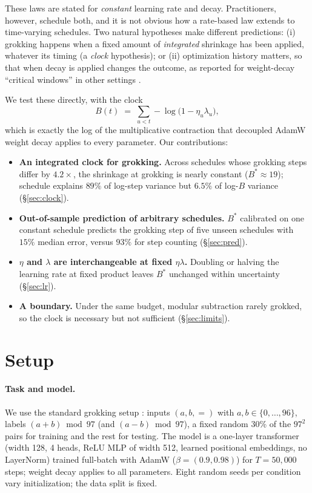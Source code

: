 \documentclass[11pt]{article}
\begin{document}
These laws are stated for \emph{constant} learning rate and decay. Practitioners, however, schedule both, and it is not obvious how a rate-based law extends to time-varying schedules. Two natural hypotheses make different predictions: (i) grokking happens when a fixed amount of \emph{integrated} shrinkage has been applied, whatever its timing (a \emph{clock} hypothesis); or (ii) optimization history matters, so that when decay is applied changes the outcome, as reported for weight-decay ``critical windows'' in other settings \citep{golatkar2019time,ali2026critical}.

We test these directly, with the clock
\begin{equation}
B(t) \;=\; \sum_{u<t} -\log\bigl(1-\eta_u\lambda_u\bigr),
\label{eq:clock}
\end{equation}
which is exactly the log of the multiplicative contraction that decoupled AdamW weight decay \citep{loshchilov2019decoupled} applies to every parameter. Our contributions:
\begin{itemize}
\item \textbf{An integrated clock for grokking.} Across schedules whose grokking steps differ by $4.2\times$, the shrinkage at grokking is nearly constant ($B^\ast\approx 19$); schedule explains $89\%$ of log-step variance but $6.5\%$ of log-$B$ variance (\S\ref{sec:clock}).
\item \textbf{Out-of-sample prediction of arbitrary schedules.} $B^\ast$ calibrated on one constant schedule predicts the grokking step of five unseen schedules with $15\%$ median error, versus $93\%$ for step counting (\S\ref{sec:pred}).
\item \textbf{$\eta$ and $\lambda$ are interchangeable at fixed $\eta\lambda$.} Doubling or halving the learning rate at fixed product leaves $B^\ast$ unchanged within uncertainty (\S\ref{sec:lr}).
\item \textbf{A boundary.} Under the same budget, modular subtraction rarely grokked, so the clock is necessary but not sufficient (\S\ref{sec:limits}).
\end{itemize}

\section{Setup}
\paragraph{Task and model.} We use the standard grokking setup \citep{nanda2023progress}: inputs $(a,b,=)$ with $a,b\in\{0,\dots,96\}$, labels $(a+b)\bmod 97$ (and $(a-b)\bmod 97$), a fixed random 30\% of the $97^2$ pairs for training and the rest for testing. The model is a one-layer transformer (width 128, 4 heads, ReLU MLP of width 512, learned positional embeddings, no LayerNorm) trained full-batch with AdamW ($\beta=(0.9,0.98)$) for $T=50{,}000$ steps; weight decay applies to all parameters. Eight random seeds per condition vary initialization; the data split is fixed.
\end{document}
